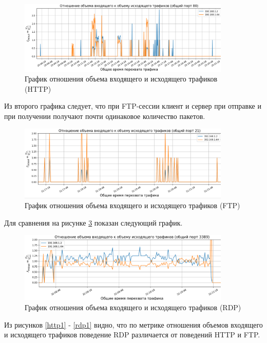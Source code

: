 \documentclass[bachelor, och, coursework]{SCWorks}
\begin{document}
\begin{figure}[H]
  \centering
  \includegraphics[width=0.9\textwidth]{pics/newhttp1.png}
  \caption{График отношения объема входящего и исходящего трафиков (HTTP)}
  \label{httpg1}
\end{figure}

Из второго графика следует, что при FTP-сессии клиент и сервер при отправке и при получении получают почти одинаковое 
количество пакетов.


\begin{figure}[H]
  \centering
  \includegraphics[width=0.9\textwidth]{pics/newftp1.png}
  \caption{График отношения объема входящего и исходящего трафиков (FTP)}
  \label{ftpg1}
\end{figure}

Для сравнения на рисунке \ref{rdpg1} показан следующий график.

\begin{figure}[H]
  \centering
  \includegraphics[width=0.9\textwidth]{pics/newrdp1.png}
  \caption{График отношения объема входящего и исходящего трафиков (RDP)}
  \label{rdpg1}
\end{figure}

Из рисунков \ref{http1} - \ref{rdp1} видно, что по метрике отношения объемов входящего и исходящего трафиков поведение RDP различается
от поведений HTTP и FTP.
\end{document}
